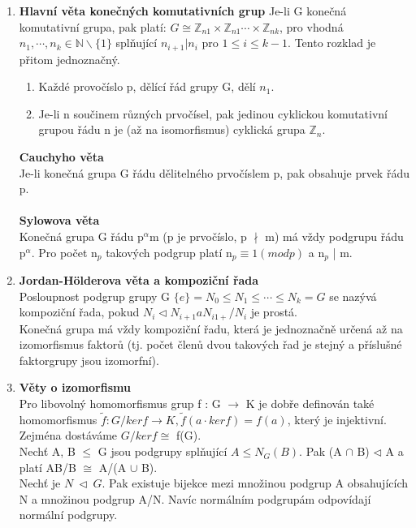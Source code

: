 \documentclass[12pt,a4paper]{article}
\begin{document}
\begin{enumerate}
		\item \textbf{Hlavní věta konečných komutativních grup}
		Je-li G konečná komutativní grupa, pak platí: $G\cong \mathbb{Z}_{n1} \times \mathbb{Z}_{n1}\cdots\times\mathbb{Z}_{nk}$, pro vhodná $n_1,\cdots,n_k\in\mathbb{N}\backslash\{1\}$ splňující $n_{i+1}|n_i$ pro $1 \leq i \leq k-1$. Tento rozklad je přitom jednoznačný.
		\begin{enumerate}
			\item Každé provočíslo p, dělící řád grupy G, dělí $n_1$.
			\item Je-li n součinem různých prvočísel, pak jedinou cyklickou komutativní grupou řádu n je (až na isomorfismus) cyklická grupa $\mathbb{Z}_n$.
		\end{enumerate}
		
		\textbf{Cauchyho věta} \\
		Je-li konečná grupa G řádu dělitelného prvočíslem p, pak obsahuje prvek řádu p.\\ \\
		\textbf{Sylowova věta} \\
		Konečná grupa G řádu p$^\alpha$m (p je prvočíslo, p $\nmid$ m) má vždy podgrupu řádu p$^\alpha$. Pro počet n$_p$ takových podgrup platí n$_p \equiv 1 (mod p)$ a n$_p$ | m. 
		
		\item \textbf{Jordan-Hölderova věta a kompoziční řada} \\
		Posloupnost podgrup grupy G $\{e\} = N_0 \leq N_1 \leq \cdots \leq N_k = G$ se nazývá kompoziční řada, pokud $N_i \lhd N_{i+1} a N_{i1+}/N_i$ je prostá.  \\Konečná grupa má vždy kompoziční řadu, která je jednoznačně určená až na izomorfismus faktorů (tj. počet členů dvou takových řad je stejný a příslušné faktorgrupy jsou izomorfní).
		
		\item \textbf{Věty o izomorfismu} \\
		Pro libovolný homomorfismus grup f : G $\rightarrow$ K je dobře definován také homomorfismus $\tilde{f} : G/ker f \rightarrow K, \tilde{f}(a \cdot ker f) = f(a)$, který je injektivní. Zejména dostáváme $G/ker f \cong$ f(G). \\
		
		Nechť A, B $\leq$ G jsou podgrupy splňující $A \leq N_G(B)$. Pak (A $\cap$ B) $\lhd$ A a platí AB/B $\cong$ A/(A $\cup$ B). \\
	
		Nechť je $N \ \lhd\ G$. Pak existuje bijekce mezi množinou podgrup A obsahujících N a množinou podgrup A/N. Navíc normálním podgrupám odpovídají normální podgrupy.
		

\end{enumerate}
\end{document}

